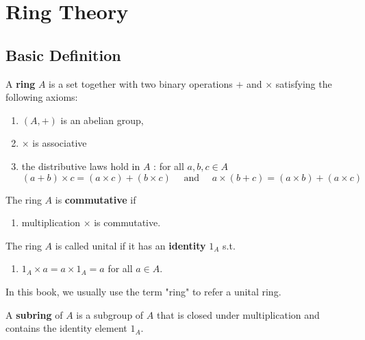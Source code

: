 \chapter{Ring Theory}

\section{Basic Definition} %
\begin{definition}
    A \textbf{ring} $A$ is a set together with two binary operations $+$ and $\times$ satisfying the following axioms:
    \begin{enumerate}[label=(\roman*)]
        \item
              $(A,+)$ is an abelian group,
        \item
              $\times $ is associative

        \item
              the distributive laws hold in $A$ : for all $a, b, c \in A$
              \begin{equation*}
                  (a+b) \times c=(a \times c)+(b \times c) \quad \text { and } \quad a \times(b+c)=(a \times b)+(a \times c)
              \end{equation*}
    \end{enumerate}
    The ring $A$ is \textbf{commutative} if
    \begin{enumerate}[resume,label=(\roman*)]
        \item
              multiplication $\times$ is commutative.
    \end{enumerate}
    The ring $A$ is called unital if it has an \textbf{identity} $1_A$  s.t.
    \begin{enumerate}[resume,label=(\roman*)]
        \item
              $1_A \times a=a \times 1_A=a$ for all $a \in A$.
    \end{enumerate}
    \begin{remark}
        In this book, we usually use the term "ring" to refer a unital ring.
    \end{remark}
\end{definition}

\begin{definition}
    A \textbf{subring} of $A$ is a subgroup of $A$ that is closed under multiplication and contains the identity element $1_A$.
\end{definition}



